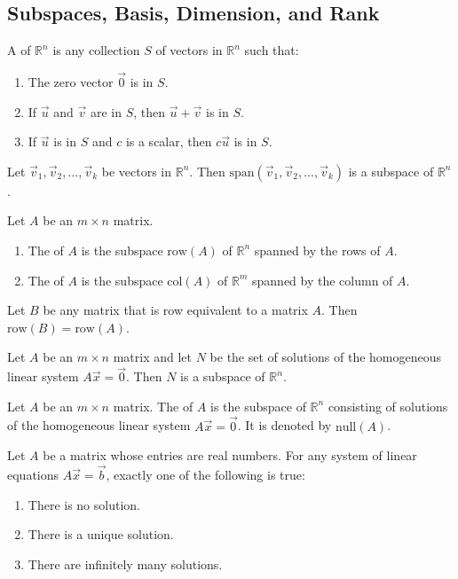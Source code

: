 \documentclass{article}
\begin{document}
\subsection{Subspaces, Basis, Dimension, and Rank}
\begin{definition}
    A  of $\mathbb{R}^n$ is any collection $S$ of vectors in $\mathbb{R}^n$ such that:
    \begin{enumerate}
        \item The zero vector $\vec 0$ is in $S$.
        \item If $\vec u$ and $\vec v$ are in $S$, then $\vec u + \vec v$ is in $S$.
        \item If $\vec u$ is in $S$ and $c$ is a scalar, then $c\vec u$ is in $S$.
    \end{enumerate}
\end{definition}
\begin{theorem}
    Let $\vec v_1, \vec v_2, ..., \vec v_k$ be vectors in $\mathbb{R}^n$. Then $\text{span}(\vec v_1, \vec v_2, ..., \vec v_k)$ is a subspace of $\mathbb{R}^n$.
\end{theorem}
\begin{definition}
    Let $A$ be an $m\times n$ matrix.
    \begin{enumerate}
        \item The  of $A$ is the subspace $\text{row}(A)$ of $\mathbb{R}^n$ spanned by the rows of $A$.
        \item The  of $A$ is the subspace $\text{col}(A)$ of $\mathbb{R}^m$ spanned by the column of $A$.
    \end{enumerate}
\end{definition}
\begin{theorem}
    Let $B$ be any matrix that is row equivalent to a matrix $A$. Then $\text{row}(B)=\text{row}(A)$.
\end{theorem}
\begin{theorem}
    Let $A$ be an $m\times n$ matrix and let $N$ be the set of solutions of the homogeneous linear system $A\vec x=\vec 0$. Then $N$ is a subspace of $\mathbb{R}^n$.
\end{theorem}
\begin{definition}
    Let $A$ be an $m\times n$ matrix. The  of $A$ is the subspace of $\mathbb{R}^n$ consisting of solutions of the homogeneous linear system $A\vec x = \vec 0$. It is denoted by $\text{null}(A)$.
\end{definition}
\begin{theorem}
    Let $A$ be a matrix whose entries are real numbers. For any system of linear equations $A\vec x =\vec b$, exactly one of the following is true:
    \begin{enumerate}
        \item There is no solution.
        \item There is a unique solution.
        \item There are infinitely many solutions.
    \end{enumerate}
\end{theorem}
\end{document}
